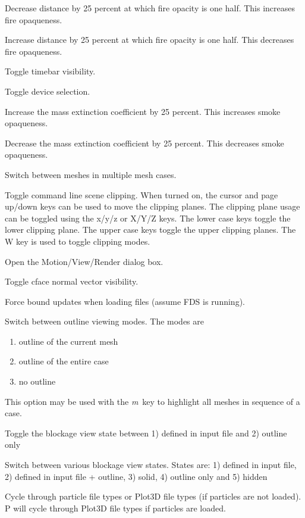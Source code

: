 \documentclass[11pt,twoside]{book}
\newcommand{\kitem}[1]{\item[{\bf {\tt #1 \  }} \hfill]}
\begin{document}
\kitem{k}Decrease distance by 25 percent at which fire opacity is one half. This increases fire opaqueness.

\kitem{K}Increase distance by 25 percent at which fire opacity is one half. This decreases fire opaqueness.

\kitem{CTRL k}Toggle timebar visibility.

\kitem{ALT k}Toggle device selection.

\kitem{l}Increase the mass extinction coefficient by 25 percent.  This increases smoke opaqueness.

\kitem{L, ALT l}Decrease the mass extinction coefficient by 25 percent.  This decreases smoke opaqueness.

\kitem{m}Switch between meshes in multiple mesh cases.

\kitem{M}Toggle command line scene clipping.  When turned on, the
cursor and page up/down keys can be used to move the clipping planes.
The clipping plane usage can be toggled using the x/y/z or X/Y/Z keys.
The lower case keys toggle the lower clipping plane.  The upper case
keys toggle the upper clipping planes.
The W key is used to toggle clipping modes.

\kitem{ALT m}Open the Motion/View/Render dialog box.

\kitem{n}Toggle cface normal vector visibility.

\kitem{N}Force bound updates when loading files (assume FDS is running).

\kitem{o}Switch between outline viewing modes. The modes are
\begin{enumerate}
\item outline of the current mesh
\item outline of the entire case
\item no outline
\end{enumerate}
This option may be used with the {\em m}\ key to highlight all meshes in sequence of a case.

\kitem{O}Toggle the blockage view state between 1) defined in input file and 2) outline only

\kitem{ALT o}Switch between various blockage view states.  States are:
1) defined in input file,
2) defined in input file + outline,
3) solid,
4) outline only and
5) hidden

\kitem{p, P}Cycle through particle file types or Plot3D file types (if particles are not loaded).
P will cycle through Plot3D file types if particles are loaded.
\end{document}
